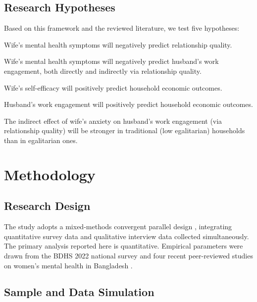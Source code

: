 \documentclass[12pt, a4paper]{article}
\begin{document}
\subsection{Research Hypotheses}

Based on this framework and the reviewed literature, we test five hypotheses:

\begin{description}[leftmargin=1.5em]
  \item[H1.] Wife's mental health symptoms will negatively predict relationship quality.
  \item[H2.] Wife's mental health symptoms will negatively predict husband's work engagement, both directly and indirectly via relationship quality.
  \item[H3.] Wife's self-efficacy will positively predict household economic outcomes.
  \item[H4.] Husband's work engagement will positively predict household economic outcomes.
  \item[H5.] The indirect effect of wife's anxiety on husband's work engagement (via relationship quality) will be stronger in traditional (low egalitarian) households than in egalitarian ones.
\end{description}


\section{Methodology}\label{sec:methods}

\subsection{Research Design}

The study adopts a mixed-methods convergent parallel design \citep{creswell2017}, integrating quantitative survey data and qualitative interview data collected simultaneously. The primary analysis reported here is quantitative. Empirical parameters were drawn from the BDHS 2022 national survey \citep{niport2023} and four recent peer-reviewed studies on women's mental health in Bangladesh \citep{islam2025, akter2025, hossain2024, rahman2025}.

\subsection{Sample and Data Simulation}
\end{document}
